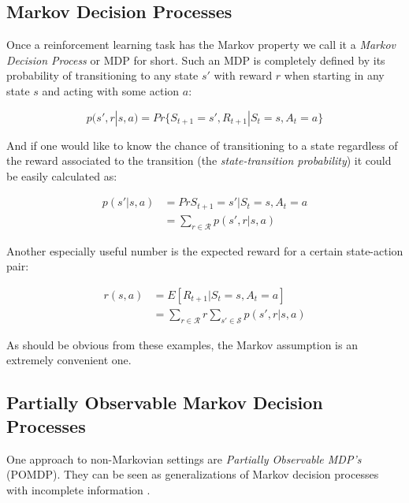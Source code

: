\subsection{Markov Decision Processes}
\label{sub:markov_decision_processes}
Once a reinforcement learning task has the Markov property
we call it a \textit{Markov Decision Process} or MDP for short.
Such an MDP is completely defined by its probability
of transitioning to any state $s'$ with reward $r$
when starting in any state $s$ and acting with some action $a$:

\begin{equation}
  p(s', r|s, a) = Pr\{S_{t+1}=s', R_{t+1}|S_t=s, A_t=a\}
\end{equation}

And if one would like to know the chance of transitioning to a state
regardless of the reward associated to the transition
(the \textit{state-transition probability})
it could be easily calculated as:

\begin{equation}
  \begin{split}
    p(s'|s, a)
    &= Pr{S_{t+1}=s'|S_t=s, A_t=a} \\
    &= \sum_{r \in \mathcal{R}} p(s', r|s, a)
  \end{split}
\end{equation}

Another especially useful number is the expected reward
for a certain state-action pair:

\begin{equation}
  \begin{split}
    r(s, a)
    &= E[R_{t+1} | S_t = s, A_t = a] \\
    &= \sum_{r \in \mathcal{R}}r \sum_{s' \in \mathcal{S}} p(s', r|s, a)
  \end{split}
\end{equation}

As should be obvious from these examples,
the Markov assumption
is an extremely convenient one.

\subsection{Partially Observable Markov Decision Processes}
\label{sub:pomdp}
One approach to non-Markovian settings
are \textit{Partially Observable MDP's} (POMDP).
They can be seen as generalizations of Markov decision processes
with incomplete information
\parencite{lovejoy1991survey}.

